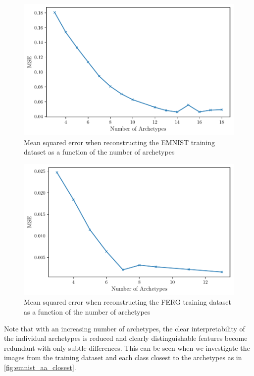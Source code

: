\begin{figure}[htpb]
	\centering
	\includegraphics{figures/samples/aa_mse_EMNIST.pdf}
	\caption{Mean squared error when reconstructing the EMNIST training
		dataset as a function of the number of archetypes}%
	\label{fig:emnist_aa_mse}
\end{figure}

\begin{figure}[htpb]
	\centering
	\includegraphics{figures/samples/aa_mse_FERG.pdf}
	\caption{Mean squared error when reconstructing the FERG training
		dataset as a function of the number of archetypes}%
	\label{fig:ferg_aa_mse}
\end{figure}

Note that with an increasing number of archetypes, the
clear interpretability of the individual archetypes is reduced and clearly
distinguishable features become redundant with only subtle differences. This
can be seen when we investigate the images from the training dataset and each
class closest to the archetypes as in \autoref{fig:emnist_aa_closest}.

